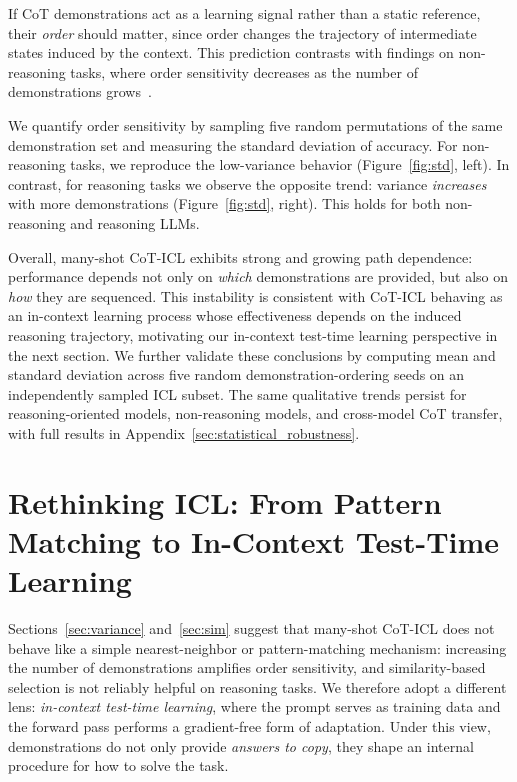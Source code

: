 \documentclass{llmxive}
\begin{document}
If CoT demonstrations act as a learning signal rather than a static reference, their \emph{order} should matter, since order changes the trajectory of intermediate states induced by the context.
This prediction contrasts with findings on non-reasoning tasks, where order sensitivity decreases as the number of demonstrations grows~\cite{bertsch-etal-2025-context,baek2025revisitingincontextlearninglong}.

We quantify order sensitivity by sampling five random permutations of the same demonstration set and measuring the standard deviation of accuracy.
For non-reasoning tasks, we reproduce the low-variance behavior (Figure~\ref{fig:std}, left).
In contrast, for reasoning tasks we observe the opposite trend: variance \emph{increases} with more demonstrations (Figure~\ref{fig:std}, right).
This holds for both non-reasoning and reasoning LLMs.

Overall, many-shot CoT-ICL exhibits strong and growing path dependence: performance depends not only on \emph{which} demonstrations are provided, but also on \emph{how} they are sequenced.
This instability is consistent with CoT-ICL behaving as an in-context learning process whose effectiveness depends on the induced reasoning trajectory, motivating our in-context test-time learning perspective in the next section.
We further validate these conclusions by computing mean and standard deviation across five random demonstration-ordering seeds on an independently sampled ICL subset. The same qualitative trends persist for reasoning-oriented models, non-reasoning models, and cross-model CoT transfer, with full results in Appendix~\ref{sec:statistical_robustness}.




















\section{Rethinking ICL: From Pattern Matching to In-Context Test-Time Learning}

Sections~\ref{sec:variance} and~\ref{sec:sim} suggest that many-shot CoT-ICL does not behave like a simple nearest-neighbor or pattern-matching mechanism: increasing the number of demonstrations amplifies order sensitivity, and similarity-based selection is not reliably helpful on reasoning tasks.
We therefore adopt a different lens: \emph{in-context test-time learning}, where the prompt serves as training data and the forward pass performs a gradient-free form of adaptation.
Under this view, demonstrations do not only provide \emph{answers to copy}, they shape an internal procedure for how to solve the task.
\end{document}
